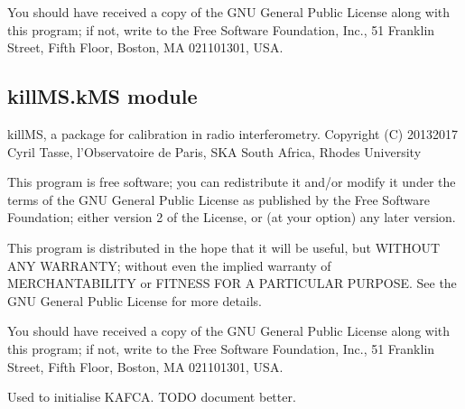 \documentclass[letterpaper,10pt,english]{sphinxmanual}
\begin{document}
\sphinxAtStartPar
You should have received a copy of the GNU General Public License
along with this program; if not, write to the Free Software
Foundation, Inc., 51 Franklin Street, Fifth Floor, Boston, MA  02110\sphinxhyphen{}1301, USA.

\begin{fulllineitems}
\label{\detokenize{api/killMS:killMS.grepall.driver}}
\pysigstartsignatures
{}
\pysigstopsignatures
\end{fulllineitems}



\subsection{killMS.kMS module}
\label{\detokenize{api/killMS:module-killMS.kMS}}\label{\detokenize{api/killMS:killms-kms-module}}
\sphinxAtStartPar
killMS, a package for calibration in radio interferometry.
Copyright (C) 2013\sphinxhyphen{}2017  Cyril Tasse, l’Observatoire de Paris,
SKA South Africa, Rhodes University

\sphinxAtStartPar
This program is free software; you can redistribute it and/or
modify it under the terms of the GNU General Public License
as published by the Free Software Foundation; either version 2
of the License, or (at your option) any later version.

\sphinxAtStartPar
This program is distributed in the hope that it will be useful,
but WITHOUT ANY WARRANTY; without even the implied warranty of
MERCHANTABILITY or FITNESS FOR A PARTICULAR PURPOSE.  See the
GNU General Public License for more details.

\sphinxAtStartPar
You should have received a copy of the GNU General Public License
along with this program; if not, write to the Free Software
Foundation, Inc., 51 Franklin Street, Fifth Floor, Boston, MA  02110\sphinxhyphen{}1301, USA.

\begin{fulllineitems}
\label{\detokenize{api/killMS:killMS.kMS.GiveNoise}}
\pysigstartsignatures
{}
\pysigstopsignatures
\sphinxAtStartPar
Used to initialise KAFCA. TODO document better.

\end{fulllineitems}
\end{document}

